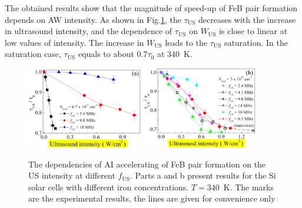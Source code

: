 \documentclass[sn-mathphys]{sn-jnl}%
\theoremstyle{thmstyleone}%
\theoremstyle{thmstyletwo}%
\theoremstyle{thmstylethree}%
\begin{document}
The obtained results show that the magnitude of speed-up of FeB pair
formation depends on AW intensity.
As shown in Fig.\ref{figfus}, the $\tau_\mathrm{US}$ decreases with the
increase in ultrasound intensity, and the dependence of $\tau_\mathrm{US}$ on
$W_\mathrm{US}$ is close to linear  at low values of intensity.
The increase in $W_\mathrm{US}$ leads to the $\tau_\mathrm{US}$ saturation.
In the saturation case, $\tau_\mathrm{US}$ equals to about 0.7$\tau_{0}$ at 340~K.


\begin{figure}
\centering
 \includegraphics[width=0.45\textwidth]{Fig4a}
 \includegraphics[width=0.45\textwidth]{Fig4b}
\caption{
The dependencies of AI accelerating of FeB pair formation on the US intensity at different $f_\mathrm{US}$.
Parts a and b present results for the Si solar cells with different iron concentrations.
$T=340$~K.
The marks are the experimental results, the lines are given for convenience only
}
\label{figfus}       %
\end{figure}
\end{document}
